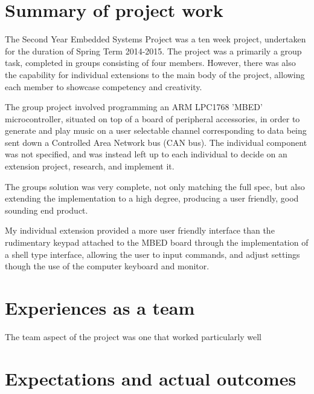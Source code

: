 \section{Summary of project work}
The Second Year Embedded Systems Project was a ten week project, undertaken 
for the duration of Spring Term 2014-2015. The project was a primarily a 
group task, completed in groups consisting of four members. However, there 
was also the capability for individual extensions to the main body of the 
project, allowing each member to showcase competency and creativity.

The group project involved programming an ARM LPC1768 'MBED' microcontroller, 
situated on top of a board of peripheral accessories, in order to 
generate and play music on a user selectable channel corresponding to data 
being sent down a Controlled Area Network bus (CAN bus). The individual 
component was not specified, and was instead left up to each individual to 
decide on an extension project, research, and implement it. 

The groups solution was very complete, not only matching the full spec, but also
extending the implementation to a high degree, producing a user friendly, good 
sounding end product. 

My individual extension provided a more user friendly interface than the 
rudimentary keypad attached to the MBED board through the implementation of a 
shell type interface, allowing the user to input commands, and adjust settings
though the use of the computer keyboard and monitor. 
 
\section{Experiences as a team}
The team aspect of the project was one that worked particularly well
\section{Expectations and actual outcomes}
